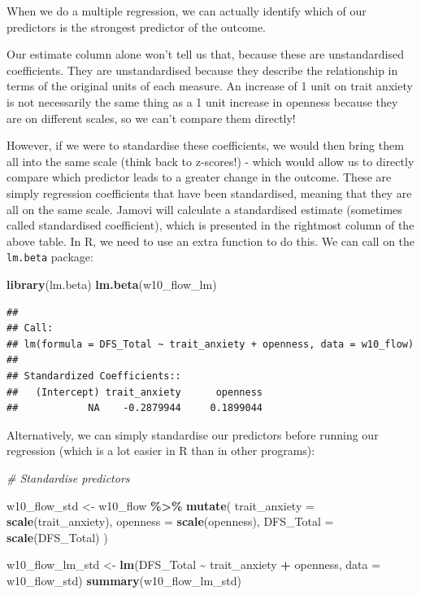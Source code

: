 \documentclass[
]{book}
\newenvironment{Shaded}{\begin{snugshade}}{\end{snugshade}}
\newcommand{\AttributeTok}[1]{\textcolor[rgb]{0.13,0.29,0.53}{#1}}
\newcommand{\CommentTok}[1]{\textcolor[rgb]{0.56,0.35,0.01}{\textit{#1}}}
\newcommand{\FunctionTok}[1]{\textcolor[rgb]{0.13,0.29,0.53}{\textbf{#1}}}
\newcommand{\NormalTok}[1]{#1}
\newcommand{\OtherTok}[1]{\textcolor[rgb]{0.56,0.35,0.01}{#1}}
\newcommand{\SpecialCharTok}[1]{\textcolor[rgb]{0.81,0.36,0.00}{\textbf{#1}}}
\begin{document}
When we do a multiple regression, we can actually identify which of our predictors is the strongest predictor of the outcome.

Our estimate column alone won't tell us that, because these are unstandardised coefficients. They are unstandardised because they describe the relationship in terms of the original units of each measure. An increase of 1 unit on trait anxiety is not necessarily the same thing as a 1 unit increase in openness because they are on different scales, so we can't compare them directly!

However, if we were to standardise these coefficients, we would then bring them all into the same scale (think back to z-scores!) - which would allow us to directly compare which predictor leads to a greater change in the outcome. These are simply regression coefficients that have been standardised, meaning that they are all on the same scale. Jamovi will calculate a standardised estimate (sometimes called standardised coefficient), which is presented in the rightmost column of the above table. In R, we need to use an extra function to do this. We can call on the \texttt{lm.beta} package:

\begin{Shaded}
\begin{Highlighting}[]
\FunctionTok{library}\NormalTok{(lm.beta)}
\FunctionTok{lm.beta}\NormalTok{(w10\_flow\_lm)}
\end{Highlighting}
\end{Shaded}

\begin{verbatim}
## 
## Call:
## lm(formula = DFS_Total ~ trait_anxiety + openness, data = w10_flow)
## 
## Standardized Coefficients::
##   (Intercept) trait_anxiety      openness 
##            NA    -0.2879944     0.1899044
\end{verbatim}

Alternatively, we can simply standardise our predictors before running our regression (which is a lot easier in R than in other programs):

\begin{Shaded}
\begin{Highlighting}[]
\CommentTok{\# Standardise predictors}

\NormalTok{w10\_flow\_std }\OtherTok{\textless{}{-}}\NormalTok{ w10\_flow }\SpecialCharTok{\%\textgreater{}\%}
  \FunctionTok{mutate}\NormalTok{(}
    \AttributeTok{trait\_anxiety =} \FunctionTok{scale}\NormalTok{(trait\_anxiety),}
    \AttributeTok{openness =} \FunctionTok{scale}\NormalTok{(openness),}
    \AttributeTok{DFS\_Total =} \FunctionTok{scale}\NormalTok{(DFS\_Total)}
\NormalTok{  )}

\NormalTok{w10\_flow\_lm\_std }\OtherTok{\textless{}{-}} \FunctionTok{lm}\NormalTok{(DFS\_Total }\SpecialCharTok{\textasciitilde{}}\NormalTok{ trait\_anxiety }\SpecialCharTok{+}\NormalTok{ openness, }\AttributeTok{data =}\NormalTok{ w10\_flow\_std)}
\FunctionTok{summary}\NormalTok{(w10\_flow\_lm\_std)}
\end{Highlighting}
\end{Shaded}
\end{document}
